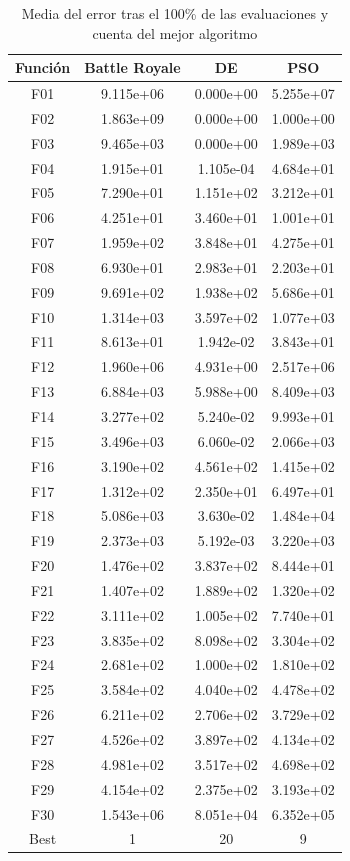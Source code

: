 \documentclass[11pt]{article}
\begin{document}
\begin{table}[H]
\centering
\begin{tabular}{|c|c|c|c|}
\hline
\textbf{Función} & \textbf{Battle Royale} &         \textbf{DE} &        \textbf{PSO} \\
\hline
F01  &     9.115e+06 &  0.000e+00 &  5.255e+07 \\
F02  &     1.863e+09 &  0.000e+00 &  1.000e+00 \\
F03  &     9.465e+03 &  0.000e+00 &  1.989e+03 \\
F04  &     1.915e+01 &  1.105e-04 &  4.684e+01 \\
F05  &     7.290e+01 &  1.151e+02 &  3.212e+01 \\
F06  &     4.251e+01 &  3.460e+01 &  1.001e+01 \\
F07  &     1.959e+02 &  3.848e+01 &  4.275e+01 \\
F08  &     6.930e+01 &  2.983e+01 &  2.203e+01 \\
F09  &     9.691e+02 &  1.938e+02 &  5.686e+01 \\
F10  &     1.314e+03 &  3.597e+02 &  1.077e+03 \\
F11  &     8.613e+01 &  1.942e-02 &  3.843e+01 \\
F12  &     1.960e+06 &  4.931e+00 &  2.517e+06 \\
F13  &     6.884e+03 &  5.988e+00 &  8.409e+03 \\
F14  &     3.277e+02 &  5.240e-02 &  9.993e+01 \\
F15  &     3.496e+03 &  6.060e-02 &  2.066e+03 \\
F16  &     3.190e+02 &  4.561e+02 &  1.415e+02 \\
F17  &     1.312e+02 &  2.350e+01 &  6.497e+01 \\
F18  &     5.086e+03 &  3.630e-02 &  1.484e+04 \\
F19  &     2.373e+03 &  5.192e-03 &  3.220e+03 \\
F20  &     1.476e+02 &  3.837e+02 &  8.444e+01 \\
F21  &     1.407e+02 &  1.889e+02 &  1.320e+02 \\
F22  &     3.111e+02 &  1.005e+02 &  7.740e+01 \\
F23  &     3.835e+02 &  8.098e+02 &  3.304e+02 \\
F24  &     2.681e+02 &  1.000e+02 &  1.810e+02 \\
F25  &     3.584e+02 &  4.040e+02 &  4.478e+02 \\
F26  &     6.211e+02 &  2.706e+02 &  3.729e+02 \\
F27  &     4.526e+02 &  3.897e+02 &  4.134e+02 \\
F28  &     4.981e+02 &  3.517e+02 &  4.698e+02 \\
F29  &     4.154e+02 &  2.375e+02 &  3.193e+02 \\
F30  &     1.543e+06 &  8.051e+04 &  6.352e+05 \\
Best &             1 &         20 &          9 \\
\hline
\end{tabular}
    \caption{Media del error tras el 100\% de las evaluaciones y cuenta del mejor algoritmo}
\end{table}
\end{document}
